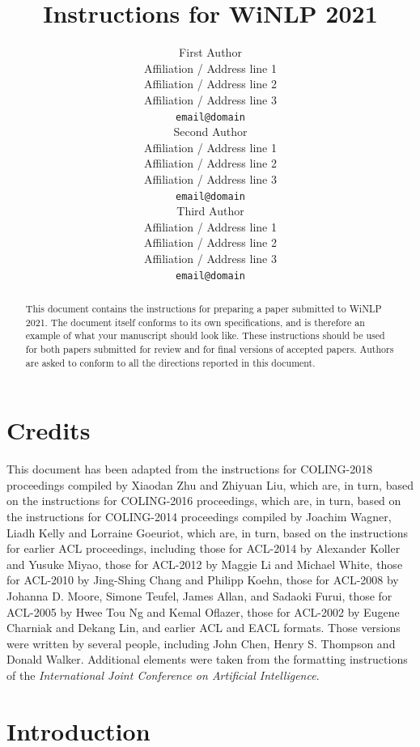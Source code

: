 \documentclass[11pt]{article}
\title{Instructions for WiNLP 2021}
\author{First Author \\
  Affiliation / Address line 1 \\
  Affiliation / Address line 2 \\
  Affiliation / Address line 3 \\
  {\tt email@domain} \\\And
  Second Author \\
  Affiliation / Address line 1 \\
  Affiliation / Address line 2 \\
  Affiliation / Address line 3 \\
  {\tt email@domain} \\\And
  Third Author \\
  Affiliation / Address line 1 \\
  Affiliation / Address line 2 \\
  Affiliation / Address line 3 \\
  {\tt email@domain} \\}
\date{}
\begin{document}
\maketitle
\begin{abstract}
  This document contains the instructions for preparing a paper submitted
  to WiNLP 2021. The document itself
  conforms to its own specifications, and is therefore an example of
  what your manuscript should look like. These instructions should be
  used for both papers submitted for review and for final versions of
  accepted papers. Authors are asked to conform to all the directions
  reported in this document.
\end{abstract}

\section{Credits}

This document has been adapted from the instructions for  
COLING-2018 proceedings compiled by Xiaodan Zhu and Zhiyuan Liu, which are, in turn, based on the instructions for COLING-2016 proceedings,
which are, in turn, based on
the instructions for
COLING-2014 proceedings compiled by Joachim Wagner, Liadh Kelly
and Lorraine Goeuriot,
which are, in turn, based on the instructions for earlier ACL proceedings,
including 
those for ACL-2014 by Alexander Koller and Yusuke Miyao,
those for ACL-2012 by Maggie Li and Michael
White, those for ACL-2010 by Jing-Shing Chang and Philipp Koehn,
those for ACL-2008 by Johanna D. Moore, Simone Teufel, James Allan,
and Sadaoki Furui, those for ACL-2005 by Hwee Tou Ng and Kemal
Oflazer, those for ACL-2002 by Eugene Charniak and Dekang Lin, and
earlier ACL and EACL formats. Those versions were written by several
people, including John Chen, Henry S. Thompson and Donald
Walker. Additional elements were taken from the formatting
instructions of the {\em International Joint Conference on Artificial
  Intelligence}.

\section{Introduction}
\label{intro}
\end{document}
